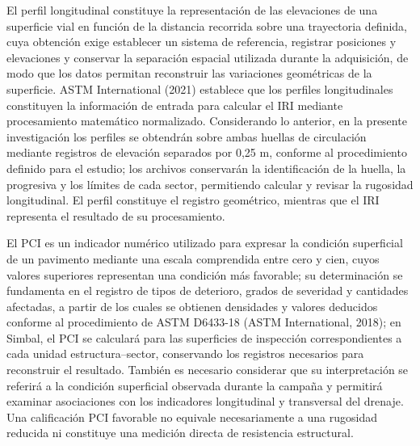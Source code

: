 
El perfil longitudinal constituye la representación de las elevaciones de una superficie vial en función de la distancia recorrida sobre una trayectoria definida, cuya obtención exige establecer un sistema de referencia, registrar posiciones y elevaciones y conservar la separación espacial utilizada durante la adquisición, de modo que los datos permitan reconstruir las variaciones geométricas de la superficie. ASTM International (2021) establece que los perfiles longitudinales constituyen la información de entrada para calcular el IRI mediante procesamiento matemático normalizado. Considerando lo anterior, en la presente investigación los perfiles se obtendrán sobre ambas huellas de circulación mediante registros de elevación separados por 0,25 m, conforme al procedimiento definido para el estudio; los archivos conservarán la identificación de la huella, la progresiva y los límites de cada sector, permitiendo calcular y revisar la rugosidad longitudinal. El perfil constituye el registro geométrico, mientras que el IRI representa el resultado de su procesamiento.


El PCI es un indicador numérico utilizado para expresar la condición superficial de un pavimento mediante una escala comprendida entre cero y cien, cuyos valores superiores representan una condición más favorable; su determinación se fundamenta en el registro de tipos de deterioro, grados de severidad y cantidades afectadas, a partir de los cuales se obtienen densidades y valores deducidos conforme al procedimiento de ASTM D6433-18 (ASTM International, 2018); en Simbal, el PCI se calculará para las superficies de inspección correspondientes a cada unidad estructura–sector, conservando los registros necesarios para reconstruir el resultado. También es necesario considerar que su interpretación se referirá a la condición superficial observada durante la campaña y permitirá examinar asociaciones con los indicadores longitudinal y transversal del drenaje. Una calificación PCI favorable no equivale necesariamente a una rugosidad reducida ni constituye una medición directa de resistencia estructural.



